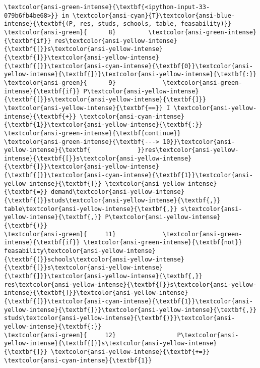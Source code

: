 \documentclass[11pt]{article}
\begin{document}
\begin{Verbatim}[commandchars=\\\{\}, frame=single, framerule=2mm, rulecolor=\color{outerrorbackground}]
\textcolor{ansi-green-intense}{\textbf{<ipython-input-33-079b6fb4be68>}} in \textcolor{ansi-cyan}{T}\textcolor{ansi-blue-intense}{\textbf{(P, res, studs, schools, table, feasability)}}
\textcolor{ansi-green}{      8}         \textcolor{ansi-green-intense}{\textbf{if}} res\textcolor{ansi-yellow-intense}{\textbf{[}}s\textcolor{ansi-yellow-intense}{\textbf{]}}\textcolor{ansi-yellow-intense}{\textbf{[}}\textcolor{ansi-cyan-intense}{\textbf{0}}\textcolor{ansi-yellow-intense}{\textbf{]}}\textcolor{ansi-yellow-intense}{\textbf{:}}
\textcolor{ansi-green}{      9}             \textcolor{ansi-green-intense}{\textbf{if}} P\textcolor{ansi-yellow-intense}{\textbf{[}}s\textcolor{ansi-yellow-intense}{\textbf{]}} \textcolor{ansi-yellow-intense}{\textbf{==}} I \textcolor{ansi-yellow-intense}{\textbf{+}} \textcolor{ansi-cyan-intense}{\textbf{1}}\textcolor{ansi-yellow-intense}{\textbf{:}} \textcolor{ansi-green-intense}{\textbf{continue}}
\textcolor{ansi-green-intense}{\textbf{---> 10}}\textcolor{ansi-yellow-intense}{\textbf{             }}res\textcolor{ansi-yellow-intense}{\textbf{[}}s\textcolor{ansi-yellow-intense}{\textbf{]}}\textcolor{ansi-yellow-intense}{\textbf{[}}\textcolor{ansi-cyan-intense}{\textbf{1}}\textcolor{ansi-yellow-intense}{\textbf{]}} \textcolor{ansi-yellow-intense}{\textbf{=}} demand\textcolor{ansi-yellow-intense}{\textbf{(}}studs\textcolor{ansi-yellow-intense}{\textbf{,}} table\textcolor{ansi-yellow-intense}{\textbf{,}} s\textcolor{ansi-yellow-intense}{\textbf{,}} P\textcolor{ansi-yellow-intense}{\textbf{)}}
\textcolor{ansi-green}{     11}             \textcolor{ansi-green-intense}{\textbf{if}} \textcolor{ansi-green-intense}{\textbf{not}} feasability\textcolor{ansi-yellow-intense}{\textbf{(}}schools\textcolor{ansi-yellow-intense}{\textbf{[}}s\textcolor{ansi-yellow-intense}{\textbf{]}}\textcolor{ansi-yellow-intense}{\textbf{,}} res\textcolor{ansi-yellow-intense}{\textbf{[}}s\textcolor{ansi-yellow-intense}{\textbf{]}}\textcolor{ansi-yellow-intense}{\textbf{[}}\textcolor{ansi-cyan-intense}{\textbf{1}}\textcolor{ansi-yellow-intense}{\textbf{]}}\textcolor{ansi-yellow-intense}{\textbf{,}} studs\textcolor{ansi-yellow-intense}{\textbf{)}}\textcolor{ansi-yellow-intense}{\textbf{:}}
\textcolor{ansi-green}{     12}                 P\textcolor{ansi-yellow-intense}{\textbf{[}}s\textcolor{ansi-yellow-intense}{\textbf{]}} \textcolor{ansi-yellow-intense}{\textbf{+=}} \textcolor{ansi-cyan-intense}{\textbf{1}}


\end{Verbatim}
\end{document}
